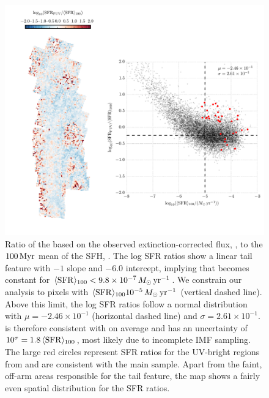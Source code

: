 \begin{figure}
\centering
\includegraphics[width=\textwidth]{m31flux-figures/sfr_fuv-vs-mean.pdf}
\caption[Ratio of the \sfr{} based on the observed extinction-corrected \fuv{}
flux to the $100\myr$ mean \sfr{}.]{Ratio of the \sfr{} based on the observed
    extinction-corrected \fuv{} flux, \sfrfuv{}, to the $100\myr$ mean of the
    SFH, \sfroneh{}. The log SFR ratios show a linear tail feature with $-1$
    slope and $-6.0$ intercept, implying that \sfrfuv{} becomes constant for
    $\langle\mathrm{SFR}\rangle_{100} < 9.8\times 10^{-7}\,M_\odot\,\mathrm{yr}^{-1}$. We constrain our analysis to
    pixels with $\langle\mathrm{SFR}\rangle_{100}10^{-5}\,M_\odot\,\mathrm{yr}^{-1}$ (vertical dashed line). Above
    this limit, the log SFR ratios follow a normal distribution with $\mu =
    -2.46\times 10^{-1}$ (horizontal dashed line) and $\sigma = 2.61\times
    10^{-1}$. \sfrfuv{} is therefore consistent with \sfroneh{} on average and
    has an uncertainty of $10^\sigma = 1.8\, \langle\mathrm{SFR}\rangle_{100}$, most likely due to
    incomplete IMF sampling. The large red circles represent SFR ratios for the
    UV-bright regions from \citet{Simones:2014} and are consistent with the
    main sample. Apart from the faint, off-arm areas responsible for the tail
    feature, the map shows a fairly even spatial distribution for the SFR
    ratios.
}
\label{fig:mfx:fuvsfrratio}
\end{figure}


